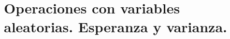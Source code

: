 %
%
%
%
%
%
%
%

\section{Operaciones con variables aleatorias. Esperanza y varianza.}
\label{sec:OperacionesVariablesAleatorias}


